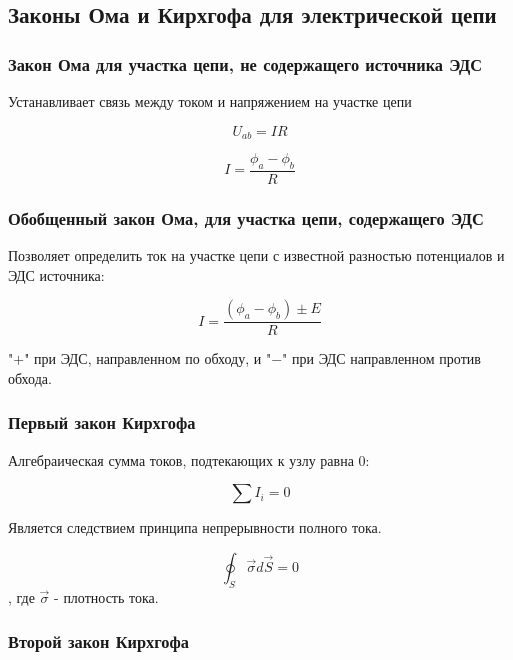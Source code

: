 \subsection{Законы Ома и Кирхгофа для электрической цепи}

\subsubsection{Закон Ома для участка цепи, не содержащего источника ЭДС}

Устанавливает связь между током и напряжением на участке цепи

\begin{equation}
U_{ab} = I R
\end{equation}

\begin{equation}
I = \frac{\phi_a - \phi_b}{R}
\end{equation}

\subsubsection{Обобщенный закон Ома, для участка цепи, содержащего ЭДС}

Позволяет определить ток на участке цепи с известной разностью потенциалов и ЭДС источника:

\begin{equation}
 I = \frac{(\phi_a - \phi_b) \pm E}{R}
\end{equation}

"$+$" при ЭДС, направленном по обходу, и "$-$" при ЭДС направленном против обхода.

\subsubsection{Первый закон Кирхгофа}

Алгебраическая сумма токов, подтекающих к узлу равна 0:

\begin{equation}
\sum I_i = 0
\end{equation}

Является следствием принципа непрерывности полного тока.

\begin{equation}
\oint_S \overrightarrow{\sigma} d \overrightarrow{S} = 0
\end{equation}
, где $ \overrightarrow{\sigma}$ - плотность тока. 

\subsubsection{Второй закон Кирхгофа}

